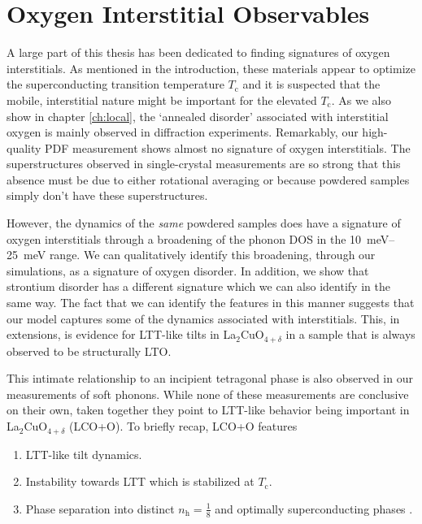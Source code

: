 \section{Oxygen Interstitial Observables}
A large part of this thesis has been dedicated to finding signatures of oxygen interstitials. As mentioned in the introduction, these materials appear to optimize the superconducting transition temperature $T_\text{c}$ and it is suspected that the mobile, interstitial nature might be important for the elevated $T_\text{c}$. As we also show in chapter \ref{ch:local}, the `annealed disorder' \cite{Wells1997} associated with interstitial oxygen is mainly observed in diffraction experiments. Remarkably, our high-quality PDF measurement shows almost no signature of oxygen interstitials. The superstructures observed in single-crystal measurements are so strong that this absence must be due to either rotational averaging or because powdered samples simply don't have these superstructures.

However, the dynamics of the \emph{same} powdered samples does have a signature of oxygen interstitials through a broadening of the phonon DOS in the \SIrange{10}{25}{\milli\eV} range. We can qualitatively identify this broadening, through our simulations, as a signature of oxygen disorder. In addition, we show that strontium disorder has a different signature which we can also identify in the same way. The fact that we can identify the features in this manner suggests that our model captures some of the dynamics associated with interstitials. This, in extensions, is evidence for LTT-like tilts in La$_2$CuO$_{4+\delta}$ in a sample that is always observed to be structurally LTO.

This intimate relationship to an incipient tetragonal phase is also observed in our measurements of soft phonons. While none of these measurements are conclusive on their own, taken together they point to LTT-like behavior being important in La$_2$CuO$_{4+\delta}$ (LCO+O). To briefly recap, LCO+O features

\begin{enumerate}
    \item LTT-like tilt dynamics.
    \item Instability towards LTT which is stabilized at $T_\text{c}$.
    \item Phase separation into distinct $n_\text{h}=\frac{1}{8}$ and optimally superconducting phases \cite{Mohottala2006,Udby2013}.
\end{enumerate}

